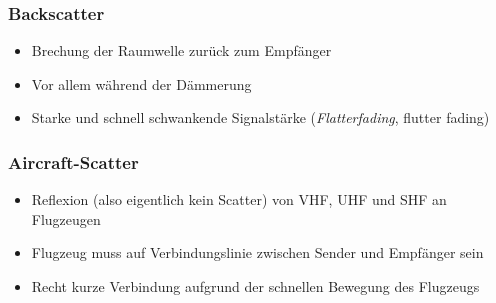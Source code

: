\begin{frame}
\frametitle{Backscatter}
\begin{itemize}
  \item Brechung der Raumwelle zurück zum Empfänger
  \item Vor allem während der Dämmerung
  \item Starke und schnell schwankende Signalstärke (\emph{Flatterfading}, flutter fading)
  \end{itemize}
\end{frame}

\begin{frame}
\end{frame}

\begin{frame}
\frametitle{Aircraft-Scatter}
\begin{itemize}
  \item Reflexion (also eigentlich kein Scatter) von VHF, UHF und SHF an Flugzeugen
  \item Flugzeug muss auf Verbindungslinie zwischen Sender und Empfänger sein
  \item Recht kurze Verbindung aufgrund der schnellen Bewegung des Flugzeugs
  \end{itemize}

\end{frame}

